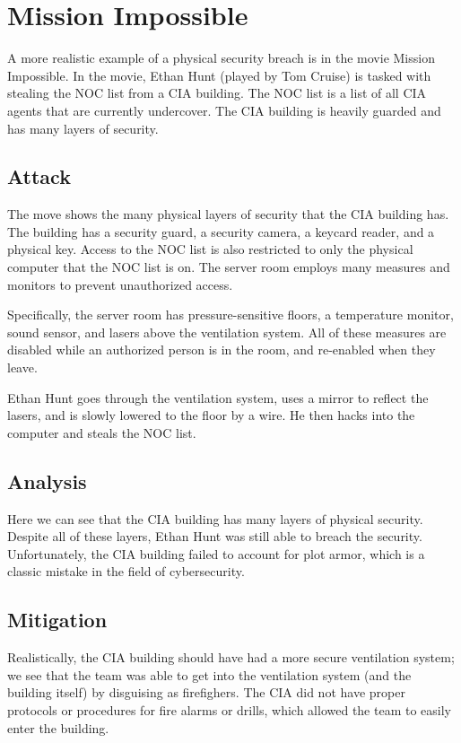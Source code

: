 \documentclass[acmsmall]{acmart}
\begin{document}
\section{Mission Impossible \texorpdfstring{\cite{missionimpossible}}{}}
A more realistic example of a physical security breach is in the movie
Mission Impossible. In the movie, Ethan Hunt (played by Tom Cruise) is tasked
with stealing the NOC list from a CIA building. The NOC list is a list of all
CIA agents that are currently undercover. The CIA building is heavily guarded
and has many layers of security.

\subsection{Attack}
The move shows the many physical layers of security that the CIA
building has. The building has a security guard, a security camera, a keycard
reader, and a physical key. Access to the NOC list is also restricted to only
the physical computer that the NOC list is on. The server room employs many
measures and monitors to prevent unauthorized access.

Specifically, the server room has pressure-sensitive floors, a temperature monitor,
sound sensor, and lasers above the ventilation system. All of these measures are disabled
while an authorized person is in the room, and re-enabled when they leave.

Ethan Hunt goes through the ventilation system, uses a mirror to reflect the
lasers, and is slowly lowered to the floor by a wire. He then hacks into the
computer and steals the NOC list.

\subsection{Analysis}
Here we can see that the CIA building has many layers of physical security.
Despite all of these layers, Ethan Hunt was still able to breach the security.
Unfortunately, the CIA building failed to account for plot armor, which is
a classic mistake in the field of cybersecurity.

\subsection{Mitigation}
Realistically, the CIA building should have had a more secure ventilation system;
we see that the team was able to get into the ventilation system (and the building itself)
by disguising as firefighers. The CIA did not have proper protocols or procedures
for fire alarms or drills, which allowed the team to easily enter the building.
\end{document}
